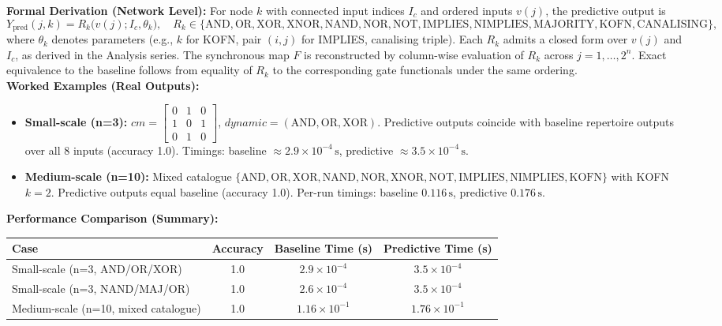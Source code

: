 \documentclass[11pt]{article}
\begin{document}
\textbf{Formal Derivation (Network Level):} For node \(k\) with connected input indices \(I_c\) and ordered inputs \(v(j)\), the predictive output is
\[
Y_{\mathrm{pred}}(j,k) = R_k\big(v(j); I_c, \theta_k\big),\quad R_k \in \{\text{AND},\text{OR},\text{XOR},\text{XNOR},\text{NAND},\text{NOR},\text{NOT},\text{IMPLIES},\text{NIMPLIES},\text{MAJORITY},\text{KOFN},\text{CANALISING}\},
\]
where \(\theta_k\) denotes parameters (e.g., \(k\) for KOFN, pair \((i,j)\) for IMPLIES, canalising triple). Each \(R_k\) admits a closed form over \(v(j)\) and \(I_c\), as derived in the Analysis series. The synchronous map \(F\) is reconstructed by column-wise evaluation of \(R_k\) across \(j=1,\dots,2^n\). Exact equivalence to the baseline follows from equality of \(R_k\) to the corresponding gate functionals under the same ordering.\\
\textbf{Worked Examples (Real Outputs):}
\begin{itemize}
 \item \textbf{Small-scale (n=3):} \(cm=\begin{bmatrix}0&1&0\\1&0&1\\0&1&0\end{bmatrix}\), \(dynamic=(\mathrm{AND},\mathrm{OR},\mathrm{XOR})\). Predictive outputs coincide with baseline repertoire outputs over all 8 inputs (accuracy 1.0). Timings: baseline \(\approx 2.9\times 10^{-4}\,\mathrm{s}\), predictive \(\approx 3.5\times 10^{-4}\,\mathrm{s}\).
 \item \textbf{Medium-scale (n=10):} Mixed catalogue \(\{\mathrm{AND}, \mathrm{OR}, \mathrm{XOR}, \mathrm{NAND}, \mathrm{NOR}, \mathrm{XNOR}, \mathrm{NOT}, \mathrm{IMPLIES}, \mathrm{NIMPLIES}, \mathrm{KOFN}\}\) with KOFN \(k=2\). Predictive outputs equal baseline (accuracy 1.0). Per-run timings: baseline \(0.116\,\mathrm{s}\), predictive \(0.176\,\mathrm{s}\).
\end{itemize}
\textbf{Performance Comparison (Summary):}
\begin{center}
\begin{tabular}{lccc}
\toprule
\textbf{Case} & \textbf{Accuracy} & \textbf{Baseline Time (s)} & \textbf{Predictive Time (s)} \\
\midrule
Small-scale (n=3, AND/OR/XOR) & 1.0 & $2.9\times 10^{-4}$ & $3.5\times 10^{-4}$ \\
Small-scale (n=3, NAND/MAJ/OR) & 1.0 & $2.6\times 10^{-4}$ & $3.5\times 10^{-4}$ \\
Medium-scale (n=10, mixed catalogue) & 1.0 & $1.16\times 10^{-1}$ & $1.76\times 10^{-1}$ \\
\bottomrule
\end{tabular}
\end{center}
\end{document}

